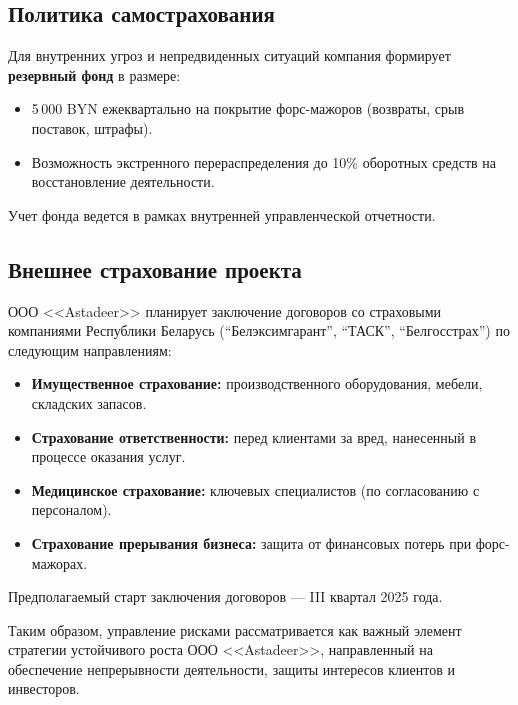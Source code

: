 \subsection{Политика самострахования}

Для внутренних угроз и непредвиденных ситуаций компания формирует \textbf{резервный фонд} в размере:

\begin{itemize}
    \item 5\,000 BYN ежеквартально на покрытие форс-мажоров (возвраты, срыв поставок, штрафы).
    \item Возможность экстренного перераспределения до 10\% оборотных средств на восстановление деятельности.
\end{itemize}

Учет фонда ведется в рамках внутренней управленческой отчетности.

\subsection{Внешнее страхование проекта}

ООО <<Astadeer>> планирует заключение договоров со страховыми компаниями Республики Беларусь (``Белэксимгарант'', ``ТАСК'', ``Белгосстрах'') по следующим направлениям:

\begin{itemize}
    \item \textbf{Имущественное страхование:} производственного оборудования, мебели, складских запасов.
    \item \textbf{Страхование ответственности:} перед клиентами за вред, нанесенный в процессе оказания услуг.
    \item \textbf{Медицинское страхование:} ключевых специалистов (по согласованию с персоналом).
    \item \textbf{Страхование прерывания бизнеса:} защита от финансовых потерь при форс-мажорах.
\end{itemize}

Предполагаемый старт заключения договоров --- III квартал 2025 года.

\bigskip

Таким образом, управление рисками рассматривается как важный элемент стратегии устойчивого роста ООО <<Astadeer>>, направленный на обеспечение непрерывности деятельности, защиты интересов клиентов и инвесторов.

